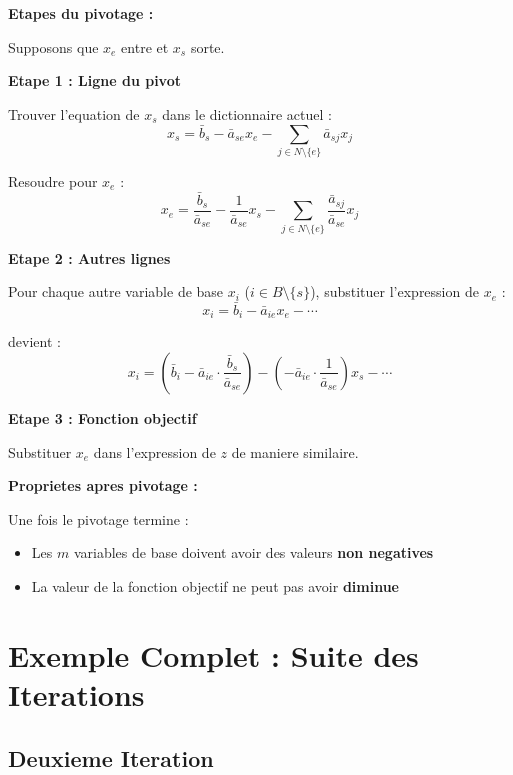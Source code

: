 \documentclass[12pt,a4paper]{article}
\begin{document}
\begin{methode}
\textbf{Etapes du pivotage :}

Supposons que $x_e$ entre et $x_s$ sorte.

\textbf{Etape 1 : Ligne du pivot}

Trouver l'equation de $x_s$ dans le dictionnaire actuel :
$$x_s = \bar{b}_s - \bar{a}_{se}x_e - \sum_{j \in N \setminus \{e\}} \bar{a}_{sj}x_j$$

Resoudre pour $x_e$ :
$$x_e = \frac{\bar{b}_s}{\bar{a}_{se}} - \frac{1}{\bar{a}_{se}}x_s - \sum_{j \in N \setminus \{e\}} \frac{\bar{a}_{sj}}{\bar{a}_{se}}x_j$$

\textbf{Etape 2 : Autres lignes}

Pour chaque autre variable de base $x_i$ ($i \in B \setminus \{s\}$), substituer l'expression de $x_e$ :
$$x_i = \bar{b}_i - \bar{a}_{ie}x_e - \cdots$$

devient :
$$x_i = \left(\bar{b}_i - \bar{a}_{ie} \cdot \frac{\bar{b}_s}{\bar{a}_{se}}\right) - \left(-\bar{a}_{ie} \cdot \frac{1}{\bar{a}_{se}}\right)x_s - \cdots$$

\textbf{Etape 3 : Fonction objectif}

Substituer $x_e$ dans l'expression de $z$ de maniere similaire.
\end{methode}

\begin{important}
\textbf{Proprietes apres pivotage :}

Une fois le pivotage termine :
\begin{itemize}
    \item Les $m$ variables de base doivent avoir des valeurs \textcolor{defvert}{\textbf{non negatives}}
    \item La valeur de la fonction objectif ne peut pas avoir \textcolor{titrebleu}{\textbf{diminue}}
\end{itemize}
\end{important}

\newpage
\section{Exemple Complet : Suite des Iterations}

\subsection{Deuxieme Iteration}
\end{document}
